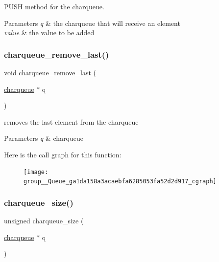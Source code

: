 P\+U\+SH method for the charqueue. 


\begin{DoxyParams}{Parameters}
{\em q} & the charqueue that will receive an element \\
\hline
{\em value} & the value to be added \\
\hline
\end{DoxyParams}
\mbox{\label{group__Queue_ga1da158a3acaebfa6285053fa52d2d917}} 
\subsubsection{\texorpdfstring{charqueue\+\_\+remove\+\_\+last()}{charqueue\_remove\_last()}}
{\footnotesize\ttfamily void charqueue\+\_\+remove\+\_\+last (\begin{DoxyParamCaption}\item[{\hyperlink{structcharqueue}{charqueue} $\ast$}]{q }\end{DoxyParamCaption})}



removes the last element from the charqueue 


\begin{DoxyParams}{Parameters}
{\em q} & charqueue \\
\hline
\end{DoxyParams}
Here is the call graph for this function\+:\nopagebreak
\begin{figure}[H]
\begin{center}
\leavevmode
\texttt{[image: group\_\_Queue\_ga1da158a3acaebfa6285053fa52d2d917\_cgraph]}
\end{center}
\end{figure}
\mbox{\label{group__Queue_ga3df2219927af0ffc207c237f99e06331}} 
\subsubsection{\texorpdfstring{charqueue\+\_\+size()}{charqueue\_size()}}
{\footnotesize\ttfamily unsigned charqueue\+\_\+size (\begin{DoxyParamCaption}\item[{\hyperlink{structcharqueue}{charqueue} $\ast$}]{q }\end{DoxyParamCaption})}



